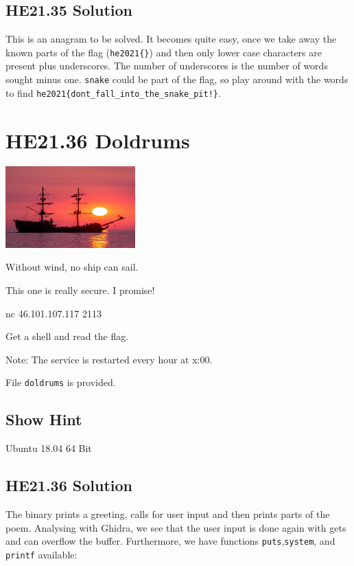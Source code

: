 \documentclass[english,a4paper,nols,noindent]{tufte-handout}
\begin{document}
\hypertarget{he21.35-solution}{%
\subsection{HE21.35 Solution}\label{he21.35-solution}}

\noindent This is an anagram to be solved.
It becomes quite easy, once we take away the known parts of the flag
(\verb+he2021{}+) and then only lower case characters are present plus
underscores.  The number of underscores is the number of words sought minus
one.  \verb+snake+ could be part of the flag, so play around with the words to find
\verb+he2021{dont_fall_into_the_snake_pit!}+.



\hypertarget{he21.36}{%
\section{HE21.36 Doldrums}
  \label{he21.36}}
\begin{marginfigure}
    \includegraphics[width=50mm]{images/challenge36.jpg}
\end{marginfigure}

\noindent Without wind, no ship can sail.

This one is really secure. I promise!

nc 46.101.107.117 2113

Get a shell and read the flag.

Note: The service is restarted every hour at x:00.

File \verb+doldrums+ is provided.

\subsection{Show Hint}
Ubuntu 18.04 64 Bit

\hypertarget{he21.36-solution}{%
\subsection{HE21.36 Solution}\label{he21.36-solution}}

\noindent The binary prints a greeting, calls for user input and then prints
parts of the poem.  Analysing with Ghidra, we see that the user input is done
again with gets and can overflow the buffer.  Furthermore, we have functions
\verb+puts+,\verb+system+, and \verb+printf+ available:
\end{document}
